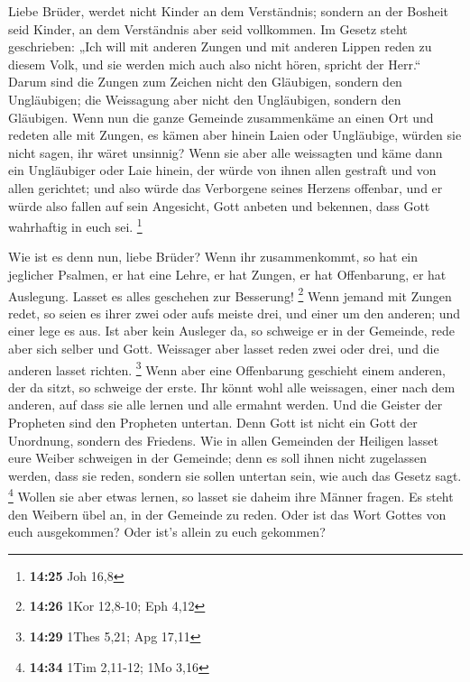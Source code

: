 Liebe Brüder, werdet nicht Kinder an dem Verständnis;
sondern an der Bosheit seid Kinder, an dem Verständnis aber seid
vollkommen.  Im Gesetz steht geschrieben: „Ich will mit
anderen Zungen und mit anderen Lippen reden zu diesem Volk, und sie
werden mich auch also nicht hören, spricht der Herr.`` 
Darum sind die Zungen zum Zeichen nicht den Gläubigen, sondern den
Ungläubigen; die Weissagung aber nicht den Ungläubigen, sondern den
Gläubigen.  Wenn nun die ganze Gemeinde zusammenkäme an
einen Ort und redeten alle mit Zungen, es kämen aber hinein Laien oder
Ungläubige, würden sie nicht sagen, ihr wäret unsinnig? 
Wenn sie aber alle weissagten und käme dann ein Ungläubiger oder Laie
hinein, der würde von ihnen allen gestraft und von allen gerichtet;
 und also würde das Verborgene seines Herzens offenbar, und
er würde also fallen auf sein Angesicht, Gott anbeten und bekennen, dass
Gott wahrhaftig in euch sei. \footnote{\textbf{14:25} Joh 16,8}

 Wie ist es denn nun, liebe Brüder? Wenn ihr zusammenkommt,
so hat ein jeglicher Psalmen, er hat eine Lehre, er hat Zungen, er hat
Offenbarung, er hat Auslegung. Lasset es alles geschehen zur Besserung!
\footnote{\textbf{14:26} 1Kor 12,8-10; Eph 4,12}  Wenn
jemand mit Zungen redet, so seien es ihrer zwei oder aufs meiste drei,
und einer um den anderen; und einer lege es aus.  Ist aber
kein Ausleger da, so schweige er in der Gemeinde, rede aber sich selber
und Gott.  Weissager aber lasset reden zwei oder drei, und
die anderen lasset richten. \footnote{\textbf{14:29} 1Thes 5,21; Apg
  17,11}  Wenn aber eine Offenbarung geschieht einem
anderen, der da sitzt, so schweige der erste.  Ihr könnt
wohl alle weissagen, einer nach dem anderen, auf dass sie alle lernen
und alle ermahnt werden.  Und die Geister der Propheten
sind den Propheten untertan.  Denn Gott ist nicht ein Gott
der Unordnung, sondern des Friedens.  Wie in allen
Gemeinden der Heiligen lasset eure Weiber schweigen in der Gemeinde;
denn es soll ihnen nicht zugelassen werden, dass sie reden, sondern sie
sollen untertan sein, wie auch das Gesetz sagt. \footnote{\textbf{14:34}
  1Tim 2,11-12; 1Mo 3,16}  Wollen sie aber etwas lernen, so
lasset sie daheim ihre Männer fragen. Es steht den Weibern übel an, in
der Gemeinde zu reden.  Oder ist das Wort Gottes von euch
ausgekommen? Oder ist's allein zu euch gekommen?

